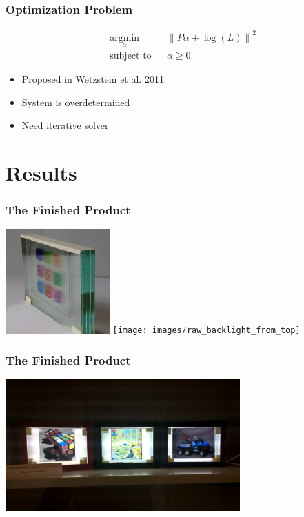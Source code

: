 \documentclass[12pt, compress]{beamer}
\begin{document}
\begin{frame}[fragile]
	\frametitle{Optimization Problem}
	
	\begin{equation*}
		\begin{aligned}
			& \underset{\alpha}{\text{argmin}} 	& & \left\lVert P \alpha + \log(L) \right\rVert ^2 \\
			& \text{subject to} 				& & \alpha \geq 0.
		\end{aligned}
	\end{equation*}
	
	\begin{itemize}
		\item Proposed in Wetzstein et al. 2011
		\item System is overdetermined
		\item Need iterative solver
	\end{itemize}
\end{frame}

\section{Results}

\begin{frame}[fragile]
	\frametitle{The Finished Product}
	\begin{center}
		\includegraphics[height=4cm]{images/glass_plates_front_view_cropped}
		\hspace{1cm}
		\texttt{[image: images/raw\_backlight\_from\_top]}
	\end{center}
\end{frame}

\begin{frame}[fragile]
	\frametitle{The Finished Product}
	\begin{center}
		\includegraphics[width=9cm]{images/all_displays_on}
	\end{center}
\end{frame}
\end{document}
